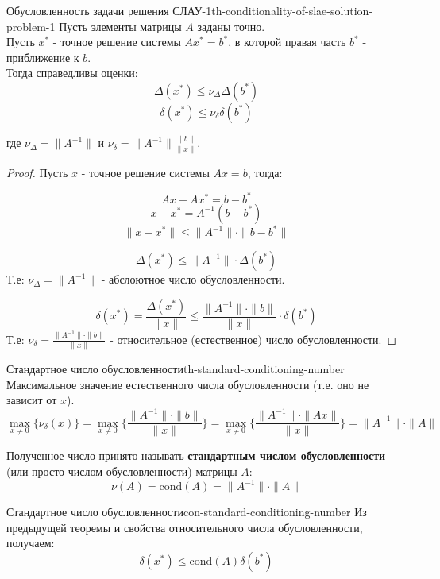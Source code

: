 \documentclass[14pt]{extarticle}
\begin{document}
    \begin{theorem}{Обусловленность задачи решения СЛАУ-1}{th-conditionality-of-slae-solution-problem-1}
        Пусть элементы матрицы $A$ заданы точно.\\
        Пусть $x^{*}$ - точное решение системы $Ax^{*} = b^{*}$, в которой правая часть $b^{*}$ - приближение к $b$.\\
        
        Тогда справедливы оценки:
        $$\Delta(x^{*}) \leq \nu_{\Delta}\Delta(b^{*})$$
        $$\delta(x^{*}) \leq \nu_{\delta}\delta(b^{*})$$

        где $\nu_{\Delta} = \|A^{-1}\|$ и $\nu_{\delta} = \|A^{-1}\|\frac{\|b\|}{\|x\|}$.
    
        \begin{proof}
            Пусть $x$ - точное решение системы $Ax = b$, тогда:
            
            $$Ax - Ax^{*} = b - b^{*}$$
            $$x - x^{*} = A^{-1}(b - b^{*})$$
            $$\|x - x^{*}\| \leq \|A^{-1}\| \cdot \|b - b^{*}\|$$

            $$\Delta(x^{*}) \leq \|A^{-1}\| \cdot \Delta(b^{*})$$
            Т.е: $\nu_{\Delta} = \|A^{-1}\|$ - абслоютное число обусловленности.

            $$\delta(x^{*}) = \frac{\Delta(x^{*})}{\|x\|} \leq \frac{\|A^{-1}\| \cdot \|b\|}{\|x\|} \cdot \delta(b^{*})$$
            Т.е: $\nu_{\delta} = \frac{\|A^{-1}\| \cdot \|b\|}{\|x\|}$ - относительное (естественное) число обусловленности.
        \end{proof}
    \end{theorem}

    \begin{theorem}{Стандартное число обусловленности}{th-standard-conditioning-number}
        Максимальное значение естественного числа обусловленности (т.е. оно не зависит от $x$).
        $$\max_{x \neq 0}\{\nu_{\delta}(x)\} = \max_{x \neq 0}\{\frac{\|A^{-1}\| \cdot \|b\|}{\|x\|}\} = \max_{x \neq 0}\{\frac{\|A^{-1}\| \cdot \|Ax\|}{\|x\|}\} = \|A^{-1}\|\cdot\|A\|$$

        Полученное число принято называть \textbf{стандартным числом обусловленности} (или просто числом обусловленности) матрицы $A$:
        $$\nu(A) = \text{cond}(A) = \|A^{-1}\| \cdot \|A\|$$
    \end{theorem}

    \begin{consequence}{Стандартное число обусловленности}{con-standard-conditioning-number}
        Из предыдущей теоремы и свойства относительного числа обусловленности, получаем:
        $$\delta(x^{*}) \leq \text{cond}(A)\delta(b^{*})$$
    \end{consequence}
\end{document}
